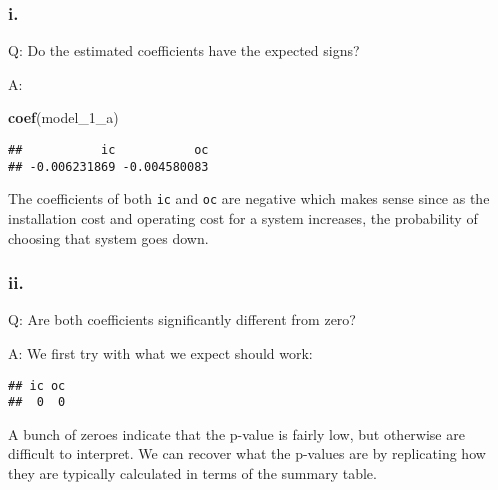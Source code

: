 \documentclass[
]{article}
\newenvironment{Shaded}{\begin{snugshade}}{\end{snugshade}}
\newcommand{\CommentTok}[1]{\textcolor[rgb]{0.56,0.35,0.01}{\textit{#1}}}
\newcommand{\DecValTok}[1]{\textcolor[rgb]{0.00,0.00,0.81}{#1}}
\newcommand{\KeywordTok}[1]{\textcolor[rgb]{0.13,0.29,0.53}{\textbf{#1}}}
\newcommand{\NormalTok}[1]{#1}
\newcommand{\OperatorTok}[1]{\textcolor[rgb]{0.81,0.36,0.00}{\textbf{#1}}}
\newcommand{\StringTok}[1]{\textcolor[rgb]{0.31,0.60,0.02}{#1}}
\begin{document}

\hypertarget{i.}{%
\subsubsection{i.}\label{i.}}

Q: Do the estimated coefficients have the expected signs?

A:

\begin{Shaded}
\begin{Highlighting}[]
\KeywordTok{coef}\NormalTok{(model_}\DecValTok{1}\NormalTok{_a)}
\end{Highlighting}
\end{Shaded}

\begin{verbatim}
##           ic           oc 
## -0.006231869 -0.004580083
\end{verbatim}

The coefficients of both \texttt{ic} and \texttt{oc} are negative which
makes sense since as the installation cost and operating cost for a
system increases, the probability of choosing that system goes down.

\hypertarget{ii.}{%
\subsubsection{ii.}\label{ii.}}

Q: Are both coefficients significantly different from zero?

A: We first try with what we expect should work:

\begin{Shaded}
\end{Shaded}

\begin{verbatim}
## ic oc 
##  0  0
\end{verbatim}

A bunch of zeroes indicate that the p-value is fairly low, but otherwise
are difficult to interpret. We can recover what the p-values are by
replicating how they are typically calculated in terms of the summary
table.
\end{document}
